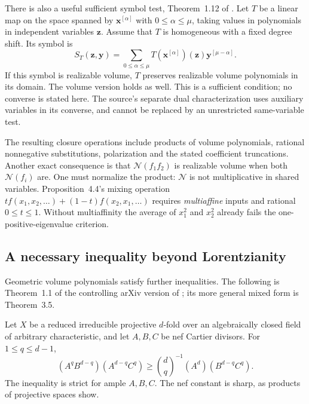 There is also a useful sufficient symbol test, Theorem~1.12 of
\cite{GrundHuhMichalekSuessWang25VolumeV1}. Let $T$ be a linear
map on the space spanned by $\mathbf x^{[\alpha]}$ with
$0\leq\alpha\leq\mu$, taking values in polynomials in
independent variables $\mathbf z$. Assume that $T$ is homogeneous
with a fixed degree shift. Its symbol is
\[
 S_T(\mathbf z,\mathbf y)
    =\sum_{0\leq\alpha\leq\mu}
            T(\mathbf x^{[\alpha]})(\mathbf z)
                       \mathbf y^{[\mu-\alpha]}.
\tag{D.39}\label{eq:appD-volume-symbol}
\]
If this symbol is realizable volume, $T$ preserves realizable
volume polynomials in its domain. The volume version holds as
well. This is a sufficient condition; no converse is stated here.
The source's separate dual characterization uses auxiliary variables
in its converse, and cannot be replaced by an unrestricted
same-variable test.

The resulting closure operations include products of volume
polynomials, rational nonnegative substitutions, polarization and
the stated coefficient truncations. Another exact consequence is
that $\mathcal N(f_1f_2)$ is realizable volume when both
$\mathcal N(f_i)$ are. One must normalize the product:
$\mathcal N$ is not multiplicative in shared variables.
Proposition~4.4's mixing operation
$t f(x_1,x_2,\ldots)+(1-t)f(x_2,x_1,\ldots)$ requires
\emph{multiaffine} inputs and rational $0\leq t\leq1$.
Without multiaffinity the average of $x_1^2$ and $x_2^2$
already fails the one-positive-eigenvalue criterion.

\subsection{A necessary inequality beyond Lorentzianity}
\label{sec:appD-reverse-KT}

Geometric volume polynomials satisfy further inequalities.
The following is Theorem~1.1 of the controlling arXiv version of
\cite{JiangLi23ReverseKTV3}; its more general mixed form is
Theorem~3.5.
\begin{theorem}
\label{thm:appD-reverse-KT}
Let $X$ be a reduced irreducible projective $d$-fold over an
algebraically closed field of arbitrary characteristic, and let
$A,B,C$ be nef Cartier divisors. For $1\leq q\leq d-1$,
\[
 (A^qB^{d-q})(A^{d-q}C^q)
   \geq\binom dq^{-1}(A^d)(B^{d-q}C^q).
\tag{D.40}\label{eq:appD-reverse-KT}
\]
The inequality is strict for ample $A,B,C$. The nef constant
is sharp, as products of projective spaces show.
\end{theorem}

